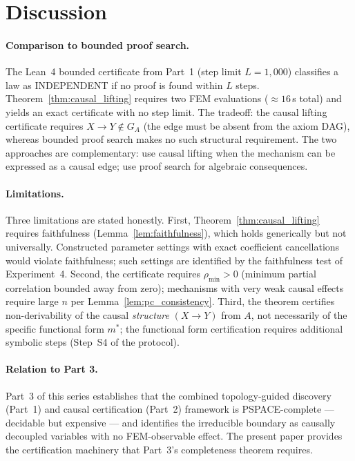 \documentclass[twoside,11pt]{article}
\begin{document}
\section{Discussion}
\label{sec:discussion}

\paragraph{Comparison to bounded proof search.}
The Lean~4 bounded certificate from Part~1 (step limit $L=1{,}000$)
classifies a law as INDEPENDENT if no proof is found within $L$ steps.
Theorem~\ref{thm:causal_lifting} requires two FEM evaluations
($\approx 16$\,s total) and yields an exact certificate with no step
limit. The tradeoff: the causal lifting certificate requires
$X \to Y \notin G_A$ (the edge must be absent from the axiom DAG),
whereas bounded proof search makes no such structural requirement.
The two approaches are complementary: use causal lifting when the
mechanism can be expressed as a causal edge; use proof search for
algebraic consequences.

\paragraph{Limitations.}
Three limitations are stated honestly. First,
Theorem~\ref{thm:causal_lifting} requires faithfulness
(Lemma~\ref{lem:faithfulness}), which holds generically but not
universally. Constructed parameter settings with exact coefficient
cancellations would violate faithfulness; such settings are identified
by the faithfulness test of Experiment~4. Second, the certificate
requires $\rho_{\min} > 0$ (minimum partial correlation bounded away
from zero); mechanisms with very weak causal effects require large $n$
per Lemma~\ref{lem:pc_consistency}. Third, the theorem certifies
non-derivability of the causal \emph{structure} $(X \to Y)$ from $A$,
not necessarily of the specific functional form $m^*$; the functional
form certification requires additional symbolic steps (Step~S4 of the
protocol).

\paragraph{Relation to Part 3.}
Part~3 of this series establishes that the combined
topology-guided discovery (Part~1) and causal certification (Part~2)
framework is PSPACE-complete --- decidable but expensive --- and
identifies the irreducible boundary as causally decoupled variables
with no FEM-observable effect. The present paper provides the
certification machinery that Part~3's completeness theorem requires.
\end{document}

